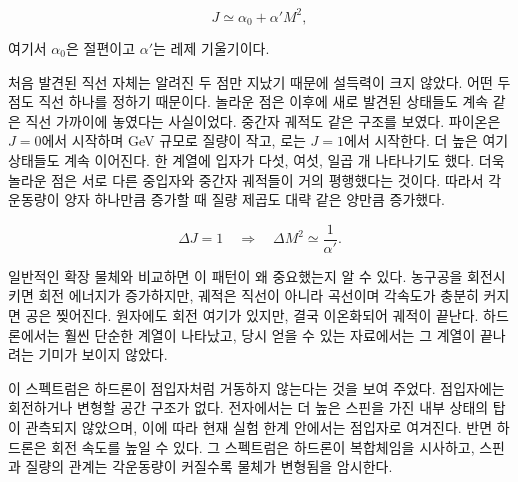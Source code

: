 \begin{equation}
  J\simeq \alpha_0+\alpha' M^2,
  \label{eq:l01-regge-trajectory}
\end{equation}

여기서 \(\alpha_0\)은 절편이고 \(\alpha'\)는 레제 기울기이다.

처음 발견된 직선 자체는 알려진 두 점만 지났기 때문에 설득력이 크지 않았다. 어떤 두 점도 직선 하나를 정하기 때문이다. 놀라운 점은 이후에 새로 발견된 상태들도 계속 같은 직선 가까이에 놓였다는 사실이었다. 중간자 궤적도 같은 구조를 보였다. 파이온은 \(J=0\)에서 시작하며 GeV 규모로 질량이 작고, 로는 \(J=1\)에서 시작한다. 더 높은 여기 상태들도 계속 이어진다. 한 계열에 입자가 다섯, 여섯, 일곱 개 나타나기도 했다. 더욱 놀라운 점은 서로 다른 중입자와 중간자 궤적들이 거의 평행했다는 것이다. 따라서 각운동량이 양자 하나만큼 증가할 때 질량 제곱도 대략 같은 양만큼 증가했다.

\begin{equation}
  \Delta J=1
  \quad\Longrightarrow\quad
  \Delta M^2\simeq \frac{1}{\alpha'}.
  \label{eq:l01-regge-spacing}
\end{equation}

\begin{classroomqa}
\end{classroomqa}

일반적인 확장 물체와 비교하면 이 패턴이 왜 중요했는지 알 수 있다. 농구공을 회전시키면 회전 에너지가 증가하지만, 궤적은 직선이 아니라 곡선이며 각속도가 충분히 커지면 공은 찢어진다. 원자에도 회전 여기가 있지만, 결국 이온화되어 궤적이 끝난다. 하드론에서는 훨씬 단순한 계열이 나타났고, 당시 얻을 수 있는 자료에서는 그 계열이 끝나려는 기미가 보이지 않았다.

이 스펙트럼은 하드론이 점입자처럼 거동하지 않는다는 것을 보여 주었다. 점입자에는 회전하거나 변형할 공간 구조가 없다. 전자에서는 더 높은 스핀을 가진 내부 상태의 탑이 관측되지 않았으며, 이에 따라 현재 실험 한계 안에서는 점입자로 여겨진다. 반면 하드론은 회전 속도를 높일 수 있다. 그 스펙트럼은 하드론이 복합체임을 시사하고, 스핀과 질량의 관계는 각운동량이 커질수록 물체가 변형됨을 암시한다.

